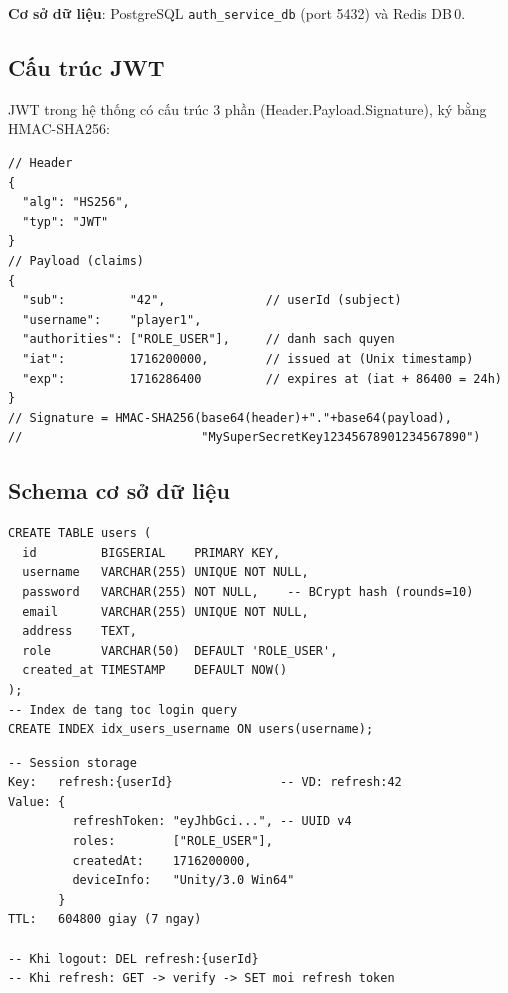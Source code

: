 \documentclass[12pt,a4paper]{report}
\begin{document}
\textbf{Cơ sở dữ liệu}: PostgreSQL \texttt{auth\_service\_db} (port 5432) và Redis DB\,0.

\subsection{Cấu trúc JWT}

JWT trong hệ thống có cấu trúc 3 phần (Header.Payload.Signature), ký bằng HMAC-SHA256:

\begin{lstlisting}[style=jsonStyle, caption={Payload của JWT token}, label={lst:jwtpayload}]
// Header
{
  "alg": "HS256",
  "typ": "JWT"
}
// Payload (claims)
{
  "sub":         "42",              // userId (subject)
  "username":    "player1",
  "authorities": ["ROLE_USER"],     // danh sach quyen
  "iat":         1716200000,        // issued at (Unix timestamp)
  "exp":         1716286400         // expires at (iat + 86400 = 24h)
}
// Signature = HMAC-SHA256(base64(header)+"."+base64(payload),
//                         "MySuperSecretKey12345678901234567890")
\end{lstlisting}

\subsection{Schema cơ sở dữ liệu}

\begin{lstlisting}[style=bashStyle, caption={Schema bảng users trong PostgreSQL}, label={lst:userschema}]
CREATE TABLE users (
  id         BIGSERIAL    PRIMARY KEY,
  username   VARCHAR(255) UNIQUE NOT NULL,
  password   VARCHAR(255) NOT NULL,    -- BCrypt hash (rounds=10)
  email      VARCHAR(255) UNIQUE NOT NULL,
  address    TEXT,
  role       VARCHAR(50)  DEFAULT 'ROLE_USER',
  created_at TIMESTAMP    DEFAULT NOW()
);
-- Index de tang toc login query
CREATE INDEX idx_users_username ON users(username);
\end{lstlisting}

\begin{lstlisting}[style=bashStyle, caption={Cấu trúc session trong Redis DB0}, label={lst:redissession}]
-- Session storage
Key:   refresh:{userId}               -- VD: refresh:42
Value: {
         refreshToken: "eyJhbGci...", -- UUID v4
         roles:        ["ROLE_USER"],
         createdAt:    1716200000,
         deviceInfo:   "Unity/3.0 Win64"
       }
TTL:   604800 giay (7 ngay)

-- Khi logout: DEL refresh:{userId}
-- Khi refresh: GET -> verify -> SET moi refresh token
\end{lstlisting}
\end{document}
